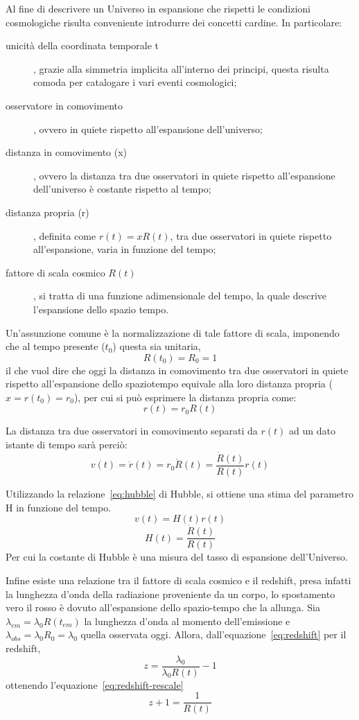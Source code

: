 Al fine di descrivere un Universo in espansione che rispetti le condizioni cosmologiche risulta conveniente introdurre dei concetti cardine. In particolare:
\begin{description}
    \item[unicità della coordinata temporale t], grazie alla simmetria implicita all'interno dei principi, questa risulta comoda per catalogare i vari eventi cosmologici;
    \item[osservatore in comovimento], ovvero in quiete rispetto all'espansione dell'universo;
    \item[distanza in comovimento (x)], ovvero la distanza tra due osservatori in quiete rispetto all'espansione dell'universo è costante rispetto al tempo;
    \item[distanza propria (r)], definita come $r(t) = x R(t)$, tra due osservatori in quiete rispetto all'espansione, varia in funzione del tempo;
    \item[fattore di scala cosmico $R(t)$], si tratta di una funzione adimensionale del tempo, la quale descrive l'espansione dello spazio tempo.
\end{description}

Un'assunzione comune è la normalizzazione di tale fattore di scala, imponendo che al tempo presente ($t_0$) questa sia unitaria,
\[
    R(t_0) = R_0 = 1
\]
il che vuol dire che oggi la distanza in comovimento tra due osservatori in quiete rispetto all'espansione dello spaziotempo equivale alla loro distanza propria ($x = r(t_0) = r_0$), per cui si può esprimere la distanza propria come:
\[
    r(t)= r_0 R(t)
\]

La distanza tra due osservatori in comovimento separati da $r(t)$ ad un dato istante di tempo sarà perciò:
\begin{equation}\label{eq:hubble-speed}
    v(t) = \dot{r}(t) = r_0 \dot{R}(t) = \frac{\dot{R}(t)}{R(t)}r(t)
\end{equation}

Utilizzando la relazione~\ref{eq:hubble} di Hubble, si ottiene una stima del parametro H in funzione del tempo.
\[
    v(t) = H(t)r(t)
\]
\begin{equation}\label{eq:hubble-scale}
    H(t) = \frac{\dot{R}(t)}{R(t)}
\end{equation}
Per cui la costante di Hubble è una misura del tasso di espansione dell'Universo.

Infine esiste una relazione tra il fattore di scala cosmico e il redshift, presa infatti la lunghezza d'onda della radiazione proveniente da un corpo, lo spostamento vero il rosso è dovuto all'espansione dello spazio-tempo che la allunga. Sia $\lambda_{em} = \lambda_0 R(t_{em})$ la lunghezza d'onda al momento dell'emissione e $\lambda_{obs} = \lambda_0 R_0 = \lambda_0$ quella osservata oggi. Allora, dall'equazione~\ref{eq:redshift} per il redshift,
\[
    z = \frac{\lambda_0}{\lambda_0 R(t)}-1
\]
ottenendo l'equazione~\ref{eq:redshift-rescale}
\begin{equation}\label{eq:redshift-rescale}
    z + 1 = \frac{1}{R(t)} 
\end{equation}